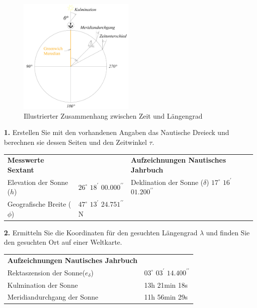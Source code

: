 \begin{refsection}
\begin{figure}
\centering
\includegraphics[width=0.5\textwidth]{kugel/Uhr.jpg}
\caption{Illustrierter Zusammenhang zwischen Zeit und Längengrad}
\label{Uhr}
\end{figure}

\textbf{1.} Erstellen Sie mit den vorhandenen Angaben das Nautische Dreieck und berechnen sie dessen Seiten und den Zeitwinkel $\tau$.

\begin{center}
\renewcommand{\arraystretch}{1.5}
\begin{tabular}{llll}
\textbf{Messwerte Sextant} & &\textbf{Aufzeichnungen Nautisches Jahrbuch} \\
Elevation der Sonne ($h$) &$26^{\circ}$ $18^{\prime}$ $00.000^{\prime \prime}$ & Deklination der Sonne ($\delta$)  \quad$17^{\circ}$ $16^{\prime}$ $01.200^{\prime \prime}$ \\
Geografische Breite ($\phi$) &$47^{\circ}$ $13^{\prime}$ $24.751^{\prime \prime}$ N
\end{tabular}
\end{center}


\textbf{2.} Ermitteln Sie die Koordinaten für den gesuchten Längengrad $\lambda$ und finden Sie den gesuchten Ort auf einer Weltkarte.

\begin{center}
\renewcommand{\arraystretch}{1.5}
\begin{tabular}{ll}
\textbf{Aufzeichnungen Nautisches Jahrbuch} \\
Rektaszension der Sonne\footnotemark ($e_\delta$) &$03^{\circ}$ $03^{\prime}$ $14.400^{\prime \prime}$ \\
Kulmination der Sonne &13h 21min 18s \\
Meridiandurchgang der Sonne &11h 56min 29s
\end{tabular}
\end{center}


\end{refsection}
